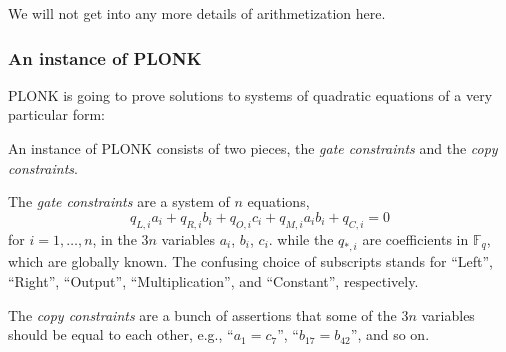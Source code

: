 We will not get into any more details of arithmetization here.

\subsubsection{An instance of PLONK}

PLONK is going to prove solutions to systems of quadratic equations of a
very particular form:

\begin{definition}
An instance of PLONK consists of two pieces, the \emph{gate constraints}
and the \emph{copy constraints}.

The \emph{gate constraints} are a system of \(n\) equations,
\[q_{L,i}a_{i} + q_{R,i}b_{i} + q_{O,i}c_{i} + q_{M,i}a_{i}b_{i} + q_{C,i} = 0\]
for \(i = 1,\ldots,n\), in the \(3n\) variables \(a_{i}\), \(b_{i}\),
\(c_{i}\). while the \(q_{\ast ,i}\) are coefficients in
\({\mathbb{F}}_{q}\), which are globally known. The confusing choice of
subscripts stands for ``Left'', ``Right'', ``Output'',
``Multiplication'', and ``Constant'', respectively.

The \emph{copy constraints} are a bunch of assertions that some of the
\(3n\) variables should be equal to each other, e.g.,
``\(a_{1} = c_{7}\)'', ``\(b_{17} = b_{42}\)'', and so on.
\end{definition}

